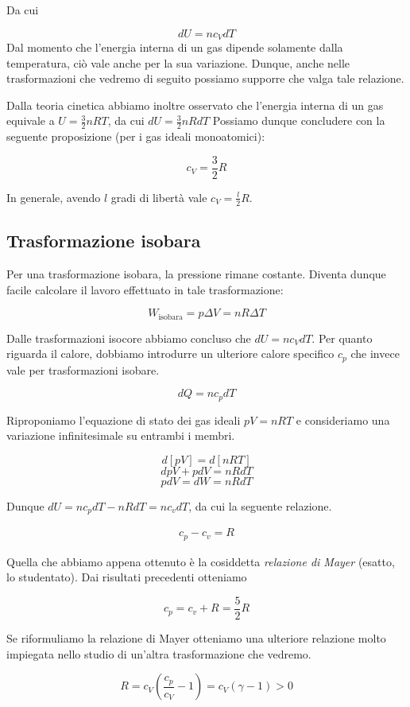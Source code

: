 Da cui

\[ dU = nc_VdT \]
Dal momento che l'energia interna di un gas dipende solamente dalla
temperatura, ciò vale anche per la sua variazione. Dunque, anche
nelle trasformazioni che vedremo di seguito possiamo supporre che
valga tale relazione.

Dalla teoria cinetica abbiamo inoltre osservato che l'energia
interna di un gas equivale a $U = \frac32nRT$, da cui
$dU = \frac32nRdT$
Possiamo dunque concludere con la seguente proposizione (per i
gas ideali monoatomici):

\[ c_V = \frac{3}{2}R \]

\noindent In generale, avendo $l$ gradi di libertà vale $c_V = \frac{l}{2}R$.

\subsection{Trasformazione isobara}
Per una trasformazione isobara, la pressione rimane costante.
Diventa dunque facile calcolare il lavoro effettuato in tale
trasformazione:

\[ W_\text{isobara} = p\Delta V = nR\Delta T \]

\noindent Dalle trasformazioni isocore abbiamo concluso che $dU = nc_VdT$.
Per quanto riguarda il calore, dobbiamo introdurre un ulteriore
calore specifico $c_p$ che invece vale per trasformazioni isobare.

\[ dQ = nc_pdT \]

\noindent Riproponiamo l'equazione di stato dei gas ideali $pV = nRT$ e
consideriamo una variazione infinitesimale su entrambi i membri.

\[ d[pV] = d[nRT] \]
\[ dpV + pdV = nRdT \]
\[ pdV = dW = nRdT \]

\noindent Dunque $dU = nc_pdT - nRdT = nc_vdT$, da cui la seguente relazione.

\begin{align}
    c_p - c_v = R
\end{align}

\noindent Quella che abbiamo appena ottenuto è la cosiddetta \textit{relazione
di Mayer} (esatto, lo studentato). Dai risultati precedenti otteniamo

\[ c_p = c_v + R = \frac52R \]

Se riformuliamo la relazione di Mayer otteniamo una ulteriore relazione
molto impiegata nello studio di un'altra trasformazione che vedremo.

\[ R = c_V\left(\frac{c_p}{c_V} - 1\right) = c_V(\gamma - 1) > 0 \]

